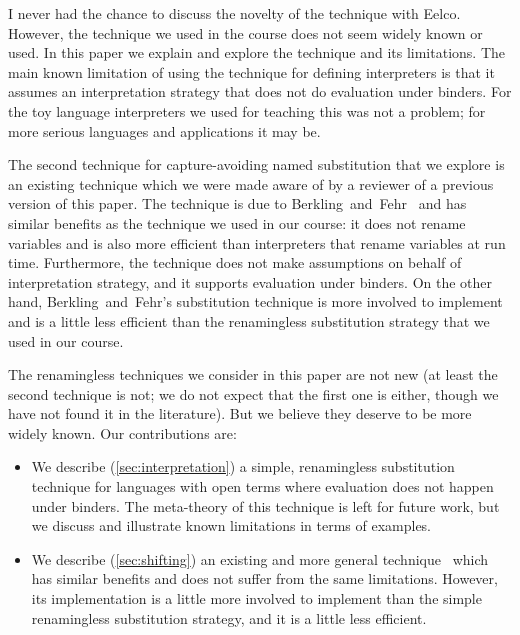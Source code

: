 I never had the chance to discuss the novelty of the technique with Eelco.
However, the technique we used in the course does not seem widely known or used.
In this paper we explain and explore the technique and its limitations.
The main known limitation of using the technique for defining interpreters is that it assumes an interpretation strategy that does not do evaluation under binders.
For the toy language interpreters we used for teaching this was not a problem; for more serious languages and applications it may be.

The second technique for capture-avoiding named substitution that we explore is an existing technique which we were made aware of by a reviewer of a previous version of this paper.
The technique is due to Berkling~and~Fehr~\cite{berkling1982amodification} and has similar benefits as the technique we used in our course: it does not rename variables and is also more efficient than interpreters that rename variables at run time.
Furthermore, the technique does not make assumptions on behalf of interpretation strategy, and it supports evaluation under binders.
On the other hand, Berkling~and~Fehr's substitution technique is more involved to implement and is a little less efficient than the renamingless substitution strategy that we used in our course.

The renamingless techniques we consider in this paper are not new (at least the second technique is not; we do not expect that the first one is either, though we have not found it in the literature).
But we believe they deserve to be more widely known.
Our contributions are:
\begin{itemize}

\item
  We describe (\cref{sec:interpretation}) a simple, renamingless substitution technique for languages with open terms where evaluation does not happen under binders.
  The meta-theory of this technique is left for future work, but we discuss and illustrate known limitations in terms of examples.

\item
  We describe (\cref{sec:shifting}) an existing and more general technique~\cite{berkling1982amodification} which has similar benefits and does not suffer from the same limitations.
  However, its implementation is a little more involved to implement than the simple renamingless substitution strategy, and it is a little less efficient.

\end{itemize}






